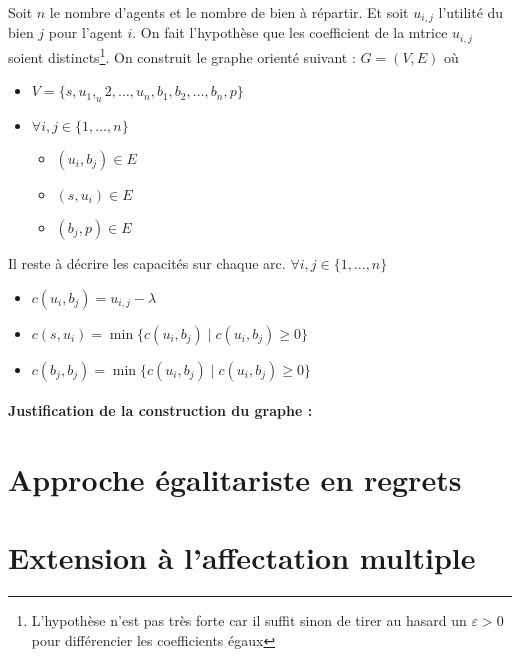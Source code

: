 \documentclass[a4paper, titlepage, oneside, 12pt]{article}%
\begin{document}
Soit $n$ le nombre d'agents et le nombre de bien à répartir. Et soit $u_{i,j}$ l'utilité du bien $j$ pour l'agent $i$. 
On fait l'hypothèse que les coefficient de la mtrice $u_{i,j}$ soient distincts\footnote{L'hypothèse n'est pas très forte car il suffit sinon de tirer au hasard un $\varepsilon>0$ pour différencier les coefficients égaux}. 
On construit le graphe orienté suivant :
$G=(V,E)$ où 
\begin{itemize}
\item $V=\{s,u_1,_u2,\dots, u_n, b_1,b_2,\dots, b_n,p\}$
\item $\forall i,j \in \{1,\dots, n\} $
  \begin{itemize}
  \item $(u_i,b_j)\in E $
  \item $(s,u_i)\in E$
  \item $(b_j,p) \in E$
  \end{itemize}
\end{itemize}  

Il reste à décrire les capacités sur chaque arc.  $\forall i,j \in \{1, \dots, n\}$
\begin{itemize}
\item $c(u_i,b_j)=u_{i,j}-\lambda$
\item $c(s,u_i)=\min \{c(u_i,b_j) \mid c(u_i,b_j)\geq 0\}$
\item $c(b_j,b_j)=\min\{c(u_i,b_j) \mid c(u_i,b_j)\geq 0\}$
\end{itemize}

\paragraph{Justification de la construction du graphe : }


\section{Approche égalitariste en regrets}
\section{Extension à l'affectation multiple}
\end{document}
